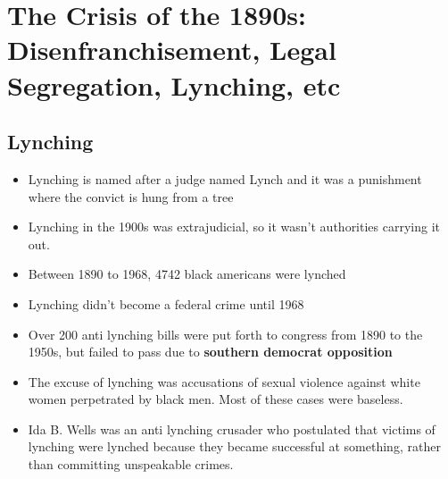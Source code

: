 \documentclass[12pt]{book}
\begin{document}
\section{The Crisis of the 1890s: Disenfranchisement, Legal Segregation, Lynching, etc}

\subsection{Lynching}

\begin{itemize}
    \item Lynching is named after a judge named Lynch and it was a punishment where the convict is hung from a tree
    \item Lynching in the 1900s was extrajudicial, so it wasn't authorities carrying it out.
    \item Between 1890 to 1968, 4742 black americans were lynched
    \item Lynching didn't become a federal crime until 1968
    \item Over 200 anti lynching bills were put forth to congress from 1890 to the 1950s, but failed to pass due to \textbf{southern democrat opposition}
    \item The excuse of lynching was accusations of sexual violence against white women perpetrated by black men. Most of these cases were baseless.
    \item Ida B. Wells was an anti lynching crusader who postulated that victims of lynching were lynched because they became successful at something, rather than committing unspeakable crimes.
\end{itemize}
\end{document}
